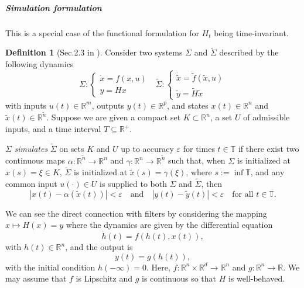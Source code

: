 \documentclass{article}
\theoremstyle{definition}
\newtheorem{definition}{Definition}
\theoremstyle{remark}
\begin{document}
\subparagraph{Simulation formulation}
This is a special case of the functional formulation for $H_t$ being time-invariant. %

\begin{definition}[Sec.2.3 in \citep{sontag1992neural}]\label{def:simulation}
Consider two systems $\Sigma$ and $\tilde\Sigma$ described by the following dynamics 
\begin{equation}
    \Sigma: \begin{cases}
        \dot x = f (x, u)\\ y = Hx
    \end{cases}
    \ \ \ 
    \tilde\Sigma: \begin{cases}
        \dot{\tilde x} = \tilde f (\tilde x, u)\\ \tilde y = \tilde H\tilde x
    \end{cases}
\end{equation} 
with inputs $u(t) \in \mathbb{R}^m$, outputs $y(t) \in \mathbb{R}^p$, and states $x(t) \in \mathbb{R}^n$ and $\tilde{x}(t) \in \mathbb{R}^{\tilde{n}}$. Suppose we are given a compact set $K \subset \mathbb{R}^n$, a set $U$ of admissible inputs, and a time interval $T \subseteq \mathbb{R}^+$.

$\Sigma$ \emph{simulates} $\tilde{\Sigma}$ on sets $K$ and $U$ up to accuracy $\varepsilon$ for times $t \in \mathbb{T}$ if there exist two continuous maps $\alpha : \mathbb{R}^{\tilde{n}} \to \mathbb{R}^n$ and $\gamma : \mathbb{R}^n \to \mathbb{R}^{\tilde{n}}$ such that, when $\Sigma$ is initialized at $x(s) = \xi \in K$, $\tilde{\Sigma}$ is initialized at $\tilde{x}(s) = \gamma(\xi)$, where $s := \inf \mathbb{T}$, and any common input $u(\cdot) \in U$ is supplied to both $\Sigma$ and $\tilde{\Sigma}$, then
\[
|x(t) - \alpha(\tilde{x}(t))| < \varepsilon \quad \text{and} \quad |y(t) - \tilde{y}(t)| < \varepsilon \quad \text{for all } t \in \mathbb{T}.
\]
\end{definition}


We can see the direct connection with filters by considering the mapping \( x \mapsto H(x) = y \) where the dynamics are given by the differential equation
\begin{equation}\label{eq:hidden}
\dot{h}(t) = f(h(t), x(t)),
\end{equation}
with \( h(t) \in \mathbb{R}^n \), and the output is
\begin{equation}\label{eq:output}
y(t) = g(h(t)),
\end{equation}
with the initial condition $h(-\infty) = 0$.
Here, \( f: \mathbb{R}^n \times \mathbb{R}^d \to \mathbb{R}^n \) and \( g: \mathbb{R}^n \to \mathbb{R} \).
We may assume that \( f \) is Lipschitz and \( g \) is continuous so that \( H \) is well-behaved.
\end{document}
